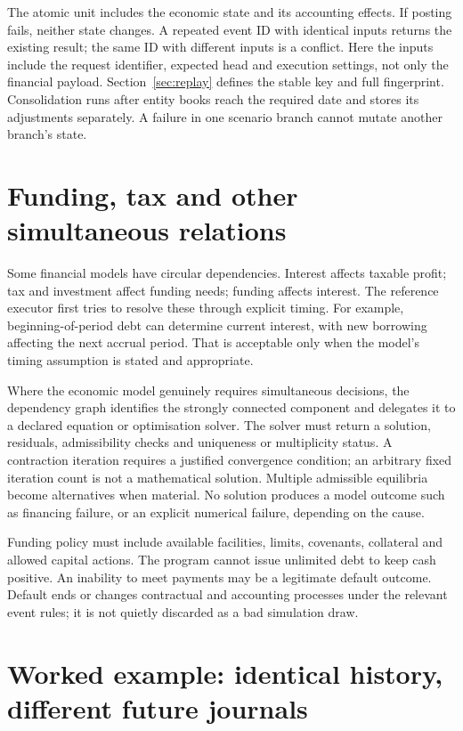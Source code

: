The atomic unit includes the economic state and its accounting effects.
If posting fails, neither state changes. A repeated event ID with identical
inputs returns the existing result; the same ID with different inputs is a
conflict. Here the inputs include the request identifier, expected head and
execution settings, not only the financial payload. Section~\ref{sec:replay}
defines the stable key and full fingerprint. Consolidation runs after entity books reach the required date and
stores its adjustments separately. A failure in one scenario branch cannot
mutate another branch's state.


\section{Funding, tax and other simultaneous relations}

Some financial models have circular dependencies. Interest affects taxable
profit; tax and investment affect funding needs; funding affects interest.
The reference executor first tries to resolve these through explicit timing.
For example, beginning-of-period debt can determine current interest, with
new borrowing affecting the next accrual period. That is acceptable only when
the model's timing assumption is stated and appropriate.

Where the economic model genuinely requires simultaneous decisions, the
dependency graph identifies the strongly connected component and delegates it
to a declared equation or optimisation solver. The solver must return a
solution, residuals, admissibility checks and uniqueness or multiplicity
status. A contraction iteration requires a justified convergence condition;
an arbitrary fixed iteration count is not a mathematical solution. Multiple
admissible equilibria become alternatives when material. No solution produces
a model outcome such as financing failure, or an explicit numerical failure,
depending on the cause.

Funding policy must include available facilities, limits, covenants, collateral
and allowed capital actions. The program cannot issue unlimited debt to keep
cash positive. An inability to meet payments may be a legitimate default
outcome. Default ends or changes contractual and accounting processes under
the relevant event rules; it is not quietly discarded as a bad simulation draw.

\section{Worked example: identical history, different future journals}

